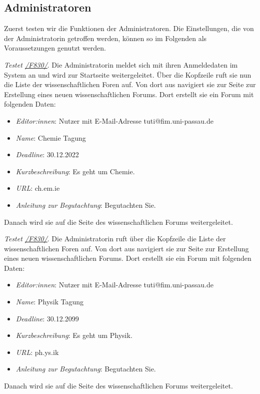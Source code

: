 \subsection{Administratoren}
Zuerst testen wir die Funktionen der Administratoren.
Die Einstellungen, die von der Administratorin getroffen werden, können so im Folgenden als Voraussetzungen genutzt werden.
\begin{description}

	 \emph{Testet \hyperref[funkt:830]{/F830/}}.
	Die Administratorin meldet sich mit ihren Anmeldedaten im System an und wird zur Startseite weitergeleitet.
	Über die Kopfzeile ruft sie nun die Liste der wissenschaftlichen Foren auf.
	Von dort aus navigiert sie zur Seite zur Erstellung eines neuen wissenschaftlichen Forums.
	Dort erstellt sie ein Forum mit folgenden Daten:
	\begin{itemize}
		\item \emph{Editor:innen}: Nutzer mit E-Mail-Adresse tuti@fim.uni-passau.de
		\item \emph{Name}: Chemie Tagung
		\item \emph{Deadline}: 30.12.2022
		\item \emph{Kurzbeschreibung}: Es geht um Chemie.
		\item \emph{URL}: ch.em.ie
		\item \emph{Anleitung zur Begutachtung}: Begutachten Sie.
	\end{itemize}
	Danach wird sie auf die Seite des wissenschaftlichen Forums weitergeleitet.

	 \emph{Testet \hyperref[funkt:830]{/F830/}}.
	Die Administratorin ruft über die Kopfzeile die Liste der wissenschaftlichen Foren auf.
	Von dort aus navigiert sie zur Seite zur Erstellung eines neuen wissenschaftlichen Forums.
	Dort erstellt sie ein Forum mit folgenden Daten:
	\begin{itemize}
		\item \emph{Editor:innen}: Nutzer mit E-Mail-Adresse tuti@fim.uni-passau.de
		\item \emph{Name}: Physik Tagung
		\item \emph{Deadline}: 30.12.2099
		\item \emph{Kurzbeschreibung}: Es geht um Physik.
		\item \emph{URL}: ph.ys.ik
		\item \emph{Anleitung zur Begutachtung}: Begutachten Sie.
	\end{itemize}
	Danach wird sie auf die Seite des wissenschaftlichen Forums weitergeleitet.

\end{description}

